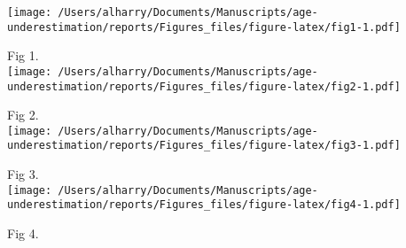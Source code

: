 \documentclass[]{article}
\begin{document}
\nolinenumbers

\texttt{[image: /Users/alharry/Documents/Manuscripts/age-underestimation/reports/Figures\_files/figure-latex/fig1-1.pdf]}

Fig 1.\\
\newpage
\texttt{[image: /Users/alharry/Documents/Manuscripts/age-underestimation/reports/Figures\_files/figure-latex/fig2-1.pdf]}

Fig 2.\\
\newpage
\texttt{[image: /Users/alharry/Documents/Manuscripts/age-underestimation/reports/Figures\_files/figure-latex/fig3-1.pdf]}

Fig 3.\\
\newpage
\texttt{[image: /Users/alharry/Documents/Manuscripts/age-underestimation/reports/Figures\_files/figure-latex/fig4-1.pdf]}

Fig 4.
\end{document}

